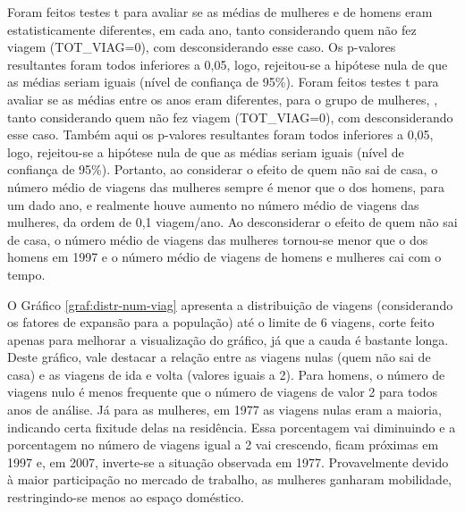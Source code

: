 Foram feitos testes t para avaliar se as médias de mulheres e de homens eram estatisticamente diferentes, em cada ano, tanto considerando quem não fez viagem (TOT_VIAG=0), com desconsiderando esse caso. Os p-valores resultantes foram todos inferiores a 0,05, logo, rejeitou-se a hipótese nula de que as médias seriam iguais (nível de confiança de 95\%).
Foram feitos testes t para avaliar se as médias entre os anos eram diferentes, para o grupo de mulheres, , tanto considerando quem não fez viagem (TOT_VIAG=0), com desconsiderando esse caso. Também aqui os p-valores resultantes foram todos inferiores a 0,05, logo, rejeitou-se a hipótese nula de que as médias seriam iguais (nível de confiança de 95\%). 
Portanto, ao considerar o efeito de quem não sai de casa, o número médio de viagens das mulheres sempre é menor que o dos homens, para um dado ano, e realmente houve aumento no número médio de viagens das mulheres, da ordem de 0,1 viagem/ano.
Ao desconsiderar o efeito de quem não sai de casa, o número médio de viagens das mulheres tornou-se menor que o dos homens em 1997 e o número médio de viagens de homens e mulheres cai com o tempo.

O Gráfico \ref{graf:distr-num-viag} apresenta a distribuição de viagens (considerando os fatores de expansão para a população) até o limite de 6 viagens, corte feito apenas para melhorar a visualização do gráfico, já que a cauda é bastante longa. 
Deste gráfico, vale destacar a relação entre as viagens nulas (quem não sai de casa) e as viagens de ida e volta (valores iguais a 2). Para homens, o número de viagens nulo é menos frequente que o número de viagens de valor 2 para todos anos de análise. Já para as mulheres, em 1977 as viagens nulas eram a maioria, indicando certa fixitude delas na residência. Essa porcentagem vai diminuindo e a porcentagem no número de viagens igual a 2 vai crescendo, ficam próximas em 1997 e, em 2007, inverte-se a situação observada em 1977.
Provavelmente devido à maior participação no mercado de trabalho, as mulheres ganharam mobilidade, restringindo-se menos ao espaço doméstico.

